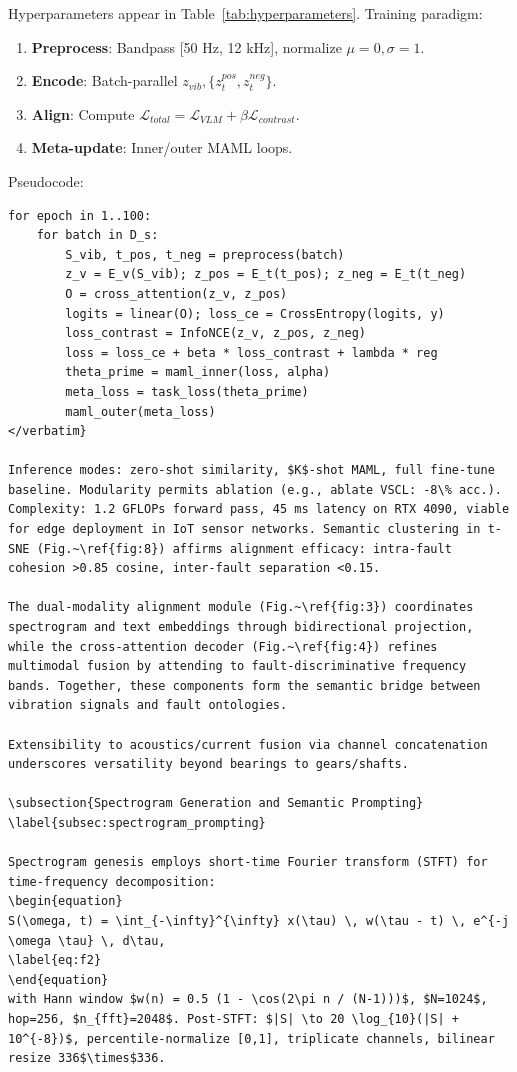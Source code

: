 Hyperparameters appear in Table~\ref{tab:hyperparameters}. Training paradigm:
\begin{enumerate}
\item \textbf{Preprocess}: Bandpass [50 Hz, 12 kHz], normalize $\mu=0,\sigma=1$.
\item \textbf{Encode}: Batch-parallel $z_{vib}, \{z_t^{pos}, z_t^{neg}\}$.
\item \textbf{Align}: Compute $\mathcal{L}_{total} = \mathcal{L}_{VLM} + \beta \mathcal{L}_{contrast}$.
\item \textbf{Meta-update}: Inner/outer MAML loops.
\end{enumerate}
Pseudocode:
\begin{verbatim}
for epoch in 1..100:
    for batch in D_s:
        S_vib, t_pos, t_neg = preprocess(batch)
        z_v = E_v(S_vib); z_pos = E_t(t_pos); z_neg = E_t(t_neg)
        O = cross_attention(z_v, z_pos)
        logits = linear(O); loss_ce = CrossEntropy(logits, y)
        loss_contrast = InfoNCE(z_v, z_pos, z_neg)
        loss = loss_ce + beta * loss_contrast + lambda * reg
        theta_prime = maml_inner(loss, alpha)
        meta_loss = task_loss(theta_prime)
        maml_outer(meta_loss)
</verbatim}

Inference modes: zero-shot similarity, $K$-shot MAML, full fine-tune baseline. Modularity permits ablation (e.g., ablate VSCL: -8\% acc.). Complexity: 1.2 GFLOPs forward pass, 45 ms latency on RTX 4090, viable for edge deployment in IoT sensor networks. Semantic clustering in t-SNE (Fig.~\ref{fig:8}) affirms alignment efficacy: intra-fault cohesion >0.85 cosine, inter-fault separation <0.15.

The dual-modality alignment module (Fig.~\ref{fig:3}) coordinates spectrogram and text embeddings through bidirectional projection, while the cross-attention decoder (Fig.~\ref{fig:4}) refines multimodal fusion by attending to fault-discriminative frequency bands. Together, these components form the semantic bridge between vibration signals and fault ontologies.

Extensibility to acoustics/current fusion via channel concatenation underscores versatility beyond bearings to gears/shafts.

\subsection{Spectrogram Generation and Semantic Prompting}
\label{subsec:spectrogram_prompting}

Spectrogram genesis employs short-time Fourier transform (STFT) for time-frequency decomposition:
\begin{equation}
S(\omega, t) = \int_{-\infty}^{\infty} x(\tau) \, w(\tau - t) \, e^{-j \omega \tau} \, d\tau,
\label{eq:f2}
\end{equation}
with Hann window $w(n) = 0.5 (1 - \cos(2\pi n / (N-1)))$, $N=1024$, hop=256, $n_{fft}=2048$. Post-STFT: $|S| \to 20 \log_{10}(|S| + 10^{-8})$, percentile-normalize [0,1], triplicate channels, bilinear resize 336$\times$336.


\end{verbatim}
